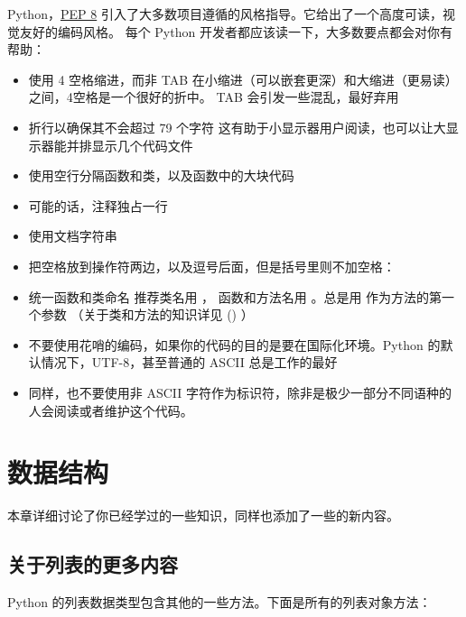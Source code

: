 \documentclass[a4paper,10pt,english]{sphinxmanual}
\begin{document}
Python，\href{https://www.python.org/dev/peps/pep-0008}{PEP 8} 引入了大多数项目遵循的风格指导。它给出了一个高度可读，视觉友好的编码风格。
每个 Python 开发者都应该读一下，大多数要点都会对你有帮助：
\begin{itemize}
\item {} 
使用 4 空格缩进，而非 TAB
在小缩进（可以嵌套更深）和大缩进（更易读）之间，4空格是一个很好的折中。
TAB 会引发一些混乱，最好弃用

\item {} 
折行以确保其不会超过 79 个字符
这有助于小显示器用户阅读，也可以让大显示器能并排显示几个代码文件

\item {} 
使用空行分隔函数和类，以及函数中的大块代码

\item {} 
可能的话，注释独占一行

\item {} 
使用文档字符串

\item {} 
把空格放到操作符两边，以及逗号后面，但是括号里则不加空格：

\item {} 
统一函数和类命名
推荐类名用 ， 函数和方法名用 。总是用  作为方法的第一个参数
（关于类和方法的知识详见 {\hyperref[classes:tut-firstclasses]{\emph{}}} () ）

\item {} 
不要使用花哨的编码，如果你的代码的目的是要在国际化环境。Python 的默认情况下，UTF-8，甚至普通的 ASCII 总是工作的最好

\item {} 
同样，也不要使用非 ASCII 字符作为标识符，除非是极少一部分不同语种的人会阅读或者维护这个代码。

\end{itemize}


\chapter{数据结构}
\label{datastructures:tut-structures}\label{datastructures:pep-484}\label{datastructures:id1}\label{datastructures::doc}
本章详细讨论了你已经学过的一些知识，同样也添加了一些的新内容。


\section{关于列表的更多内容}
\label{datastructures:tut-morelists}\label{datastructures:id2}
Python 的列表数据类型包含其他的一些方法。下面是所有的列表对象方法：
\end{document}
